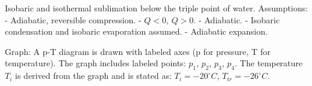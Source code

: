 Isobaric and isothermal sublimation below the triple point of water.  
Assumptions:  
- Adiabatic, reversible compression.  
- \( Q < 0 \), \( Q > 0 \).  
- Adiabatic.  
- Isobaric condensation and isobaric evaporation assumed.  
- Adiabatic expansion.  

Graph:  
A p-T diagram is drawn with labeled axes (p for pressure, T for temperature).  
The graph includes labeled points: \( p_1 \), \( p_2 \), \( p_3 \), \( p_4 \).  
The temperature \( T_i \) is derived from the graph and is stated as:  
\( T_i = -20^\circ C \), \( T_{tr} = -26^\circ C \).